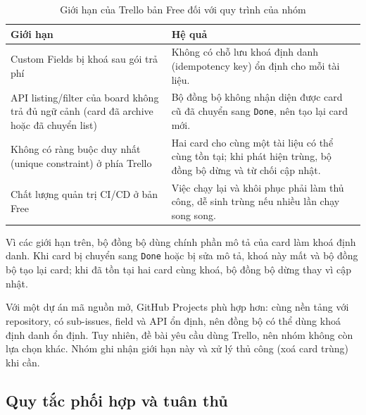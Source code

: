 \documentclass[12pt,a4paper]{article}
\begin{document}
\begin{table}[H]
  \centering
  \small
  \caption{Giới hạn của Trello bản Free đối với quy trình của nhóm}
  \begin{tabularx}{\textwidth}{P{4.8cm} Y}
    \toprule
    \textbf{Giới hạn} & \textbf{Hệ quả} \\
    \midrule
    Custom Fields bị khoá sau gói trả phí & Không có chỗ lưu khoá định danh (idempotency key) ổn định cho mỗi tài liệu. \\
    API listing/filter của board không trả đủ ngữ cảnh (card đã archive hoặc đã chuyển list) & Bộ đồng bộ không nhận diện được card cũ đã chuyển sang \texttt{Done}, nên tạo lại card mới. \\
    Không có ràng buộc duy nhất (unique constraint) ở phía Trello & Hai card cho cùng một tài liệu có thể cùng tồn tại; khi phát hiện trùng, bộ đồng bộ dừng và từ chối cập nhật. \\
    Chất lượng quản trị CI/CD ở bản Free & Việc chạy lại và khôi phục phải làm thủ công, dễ sinh trùng nếu nhiều lần chạy song song. \\
    \bottomrule
  \end{tabularx}
\end{table}

Vì các giới hạn trên, bộ đồng bộ dùng chính phần mô tả của card làm khoá định danh.
Khi card bị chuyển sang \texttt{Done} hoặc bị sửa mô tả, khoá này mất và bộ đồng bộ
tạo lại card; khi đã tồn tại hai card cùng khoá, bộ đồng bộ dừng thay vì cập nhật.

Với một dự án mã nguồn mở, GitHub Projects phù hợp hơn: cùng nền tảng với repository,
có sub-issues, field và API ổn định, nên đồng bộ có thể dùng khoá định danh ổn định.
Tuy nhiên, đề bài yêu cầu dùng Trello, nên nhóm không còn lựa chọn khác. Nhóm ghi nhận
giới hạn này và xử lý thủ công (xoá card trùng) khi cần.

\subsection{Quy tắc phối hợp và tuân thủ}
\end{document}
